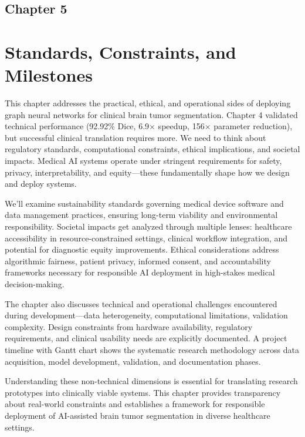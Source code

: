 \begin{center}
    \section*{\fontsize{20}{20}\selectfont Chapter 5}
\end{center}
\vspace{10mm}

\section{Standards, Constraints, and Milestones}

This chapter addresses the practical, ethical, and operational sides of deploying graph neural networks for clinical brain tumor segmentation. Chapter 4 validated technical performance (92.92\% Dice, 6.9$\times$ speedup, 156$\times$ parameter reduction), but successful clinical translation requires more. We need to think about regulatory standards, computational constraints, ethical implications, and societal impacts. Medical AI systems operate under stringent requirements for safety, privacy, interpretability, and equity—these fundamentally shape how we design and deploy systems.

We'll examine sustainability standards governing medical device software and data management practices, ensuring long-term viability and environmental responsibility. Societal impacts get analyzed through multiple lenses: healthcare accessibility in resource-constrained settings, clinical workflow integration, and potential for diagnostic equity improvements. Ethical considerations address algorithmic fairness, patient privacy, informed consent, and accountability frameworks necessary for responsible AI deployment in high-stakes medical decision-making.

The chapter also discusses technical and operational challenges encountered during development—data heterogeneity, computational limitations, validation complexity. Design constraints from hardware availability, regulatory requirements, and clinical usability needs are explicitly documented. A project timeline with Gantt chart shows the systematic research methodology across data acquisition, model development, validation, and documentation phases.

Understanding these non-technical dimensions is essential for translating research prototypes into clinically viable systems. This chapter provides transparency about real-world constraints and establishes a framework for responsible deployment of AI-assisted brain tumor segmentation in diverse healthcare settings.


